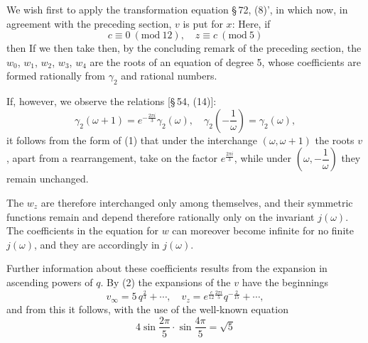 
We wish first to apply the transformation equation \S\,72, (8)',
in which now, in agreement with the preceding section,
$v$ is put for $x$:
Here, if
\[
c \equiv 0 \ (\mathrm{mod}\ 12), \quad z \equiv c \ (\mathrm{mod}\ 5)
\]
then
If we then take
then, by the concluding remark of the preceding section, the
$w_0$, $w_1$, $w_2$, $w_3$, $w_4$ are the roots of an equation of degree 5,
whose coefficients are formed rationally from $\gamma_2$ and rational
numbers.

If, however, we observe the relations [\S\,54, (14)]:
\[
\gamma_2(\omega+1) = e^{-\frac{2\pi i}{3}} \gamma_2(\omega), \quad \gamma_2\left(-\frac{1}{\omega}\right) = \gamma_2(\omega),
\]
it follows from the form of (1) that under the interchange
$(\omega, \omega+1)$ the roots $v$, apart from a rearrangement, take on the
factor $e^{\frac{2\pi i}{3}}$, while under $\left(\omega, -\dfrac{1}{\omega}\right)$ they remain
unchanged.

The $w_z$ are therefore interchanged only among themselves, and
their symmetric functions remain  and depend
therefore rationally only on the invariant $j(\omega)$. The coefficients
in the equation for $w$ can moreover become infinite for no finite $j(\omega)$,
and they are accordingly 
in $j(\omega)$.

Further information about these coefficients results
from the expansion in ascending powers of $q$. By (2) the
expansions of the $v$ have the beginnings
\[
v_\infty = 5\,q^{\frac{2}{3}} + \cdots, \quad v_z = e^{\frac{c}{12}\frac{2\pi i}{5}} q^{-\frac{2}{15}} + \cdots,
\]
and from this it follows, with the use of the well-known equation
\[
4\sin\frac{2\pi}{5}\cdot\sin\frac{4\pi}{5} = \sqrt{5}
\]
